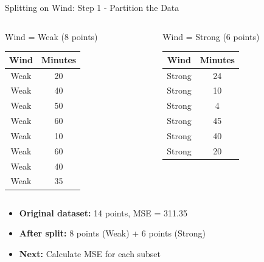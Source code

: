 \documentclass[usenames,dvipsnames]{beamer}
\begin{document}
\begin{frame}{Splitting on Wind: Step 1 - Partition the Data}
\begin{columns}
\begin{column}{.5\textwidth}
\begin{examplebox}{Wind = Weak (8 points)}
\scriptsize
\begin{tabular}{|c|c|}
\hline
\textbf{Wind} & \textbf{Minutes} \\ \hline
Weak & 20 \\
Weak & 40 \\
Weak & 50 \\
Weak & 60 \\
Weak & 10 \\
Weak & 60 \\
Weak & 40 \\
Weak & 35 \\ \hline
\end{tabular}
\end{examplebox}
\end{column}

\begin{column}{.5\textwidth}
\begin{examplebox}{Wind = Strong (6 points)}
\scriptsize
\begin{tabular}{|c|c|}
\hline
\textbf{Wind} & \textbf{Minutes} \\ \hline
Strong & 24 \\
Strong & 10 \\
Strong & 4 \\
Strong & 45 \\
Strong & 40 \\
Strong & 20 \\ \hline
\end{tabular}
\end{examplebox}
\end{column}
\end{columns}

\vspace{0.3cm}
\begin{itemize}
	\item \textbf{Original dataset:} 14 points, MSE = 311.35
	\item \textbf{After split:} 8 points (Weak) + 6 points (Strong)
	\item \textbf{Next:} Calculate MSE for each subset
\end{itemize}
\end{frame}
\end{document}
